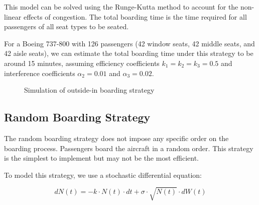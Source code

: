 \documentclass[12pt,a4paper]{article}
\begin{document}
This model can be solved using the Runge-Kutta method to account for the non-linear effects of congestion. The total boarding time is the time required for all passengers of all seat types to be seated.

For a Boeing 737-800 with 126 passengers (42 window seats, 42 middle seats, and 42 aisle seats), we can estimate the total boarding time under this strategy to be around 15 minutes, assuming efficiency coefficients $k_1 = k_2 = k_3 = 0.5$ and interference coefficients $\alpha_2 = 0.01$ and $\alpha_3 = 0.02$.

\begin{figure}[H]
\centering
{}
\caption{Simulation of outside-in boarding strategy}
\label{fig:outside_in}
\end{figure}

\subsection{Random Boarding Strategy}

The random boarding strategy does not impose any specific order on the boarding process. Passengers board the aircraft in a random order. This strategy is the simplest to implement but may not be the most efficient.

To model this strategy, we use a stochastic differential equation:

\begin{equation}
dN(t) = -k \cdot N(t) \cdot dt + \sigma \cdot \sqrt{N(t)} \cdot dW(t)
\label{eq:random_boarding}
\end{equation}
\end{document}
